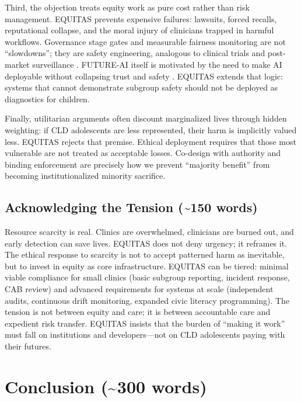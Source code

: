 \vspace{0.5em}
Third, the objection treats equity work as pure cost rather than risk management. EQUITAS prevents expensive failures: lawsuits, forced recalls, reputational collapse, and the moral injury of clinicians trapped in harmful workflows. Governance stage gates and measurable fairness monitoring are not ``slowdowns''; they are safety engineering, analogous to clinical trials and post-market surveillance \citep{Chen2023}. FUTURE-AI itself is motivated by the need to make AI deployable without collapsing trust and safety \citep{Lekadir2025}. EQUITAS extends that logic: systems that cannot demonstrate subgroup safety should not be deployed as diagnostics for children.

\vspace{0.5em}
Finally, utilitarian arguments often discount marginalized lives through hidden weighting: if CLD adolescents are less represented, their harm is implicitly valued less. EQUITAS rejects that premise. Ethical deployment requires that those most vulnerable are not treated as acceptable losses. Co-design with authority \citep{Nadarzynski2024} and binding enforcement \citep{Munn2023} are precisely how we prevent ``majority benefit'' from becoming institutionalized minority sacrifice.

\subsection{Acknowledging the Tension (\texorpdfstring{\textasciitilde}{~}150 words)}
Resource scarcity is real. Clinics are overwhelmed, clinicians are burned out, and early detection can save lives. EQUITAS does not deny urgency; it reframes it. The ethical response to scarcity is not to accept patterned harm as inevitable, but to invest in equity as core infrastructure. EQUITAS can be tiered: minimal viable compliance for small clinics (basic subgroup reporting, incident response, CAB review) and advanced requirements for systems at scale (independent audits, continuous drift monitoring, expanded civic literacy programming). The tension is not between equity and care; it is between accountable care and expedient risk transfer. EQUITAS insists that the burden of ``making it work'' must fall on institutions and developers—not on CLD adolescents paying with their futures.

\section{Conclusion (\texorpdfstring{\textasciitilde}{~}300 words)}

